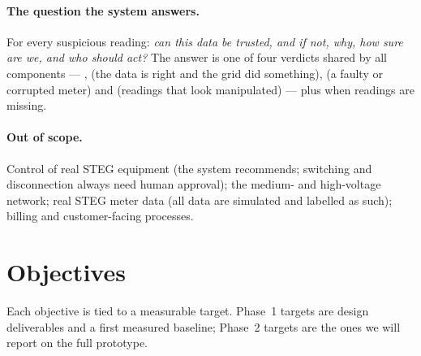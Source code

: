 \paragraph{The question the system answers.} For every suspicious reading: \emph{can this data be trusted,
and if not, why, how sure are we, and who should act?} The answer is one of four verdicts shared by all
components --- \NORM, \GE{} (the data is right and the grid did something), \MF{} (a faulty or corrupted
meter) and \SD{} (readings that look manipulated) --- plus \ND{} when readings are missing.

\paragraph{Out of scope.} Control of real STEG equipment (the system recommends; switching and disconnection
always need human approval); the medium- and high-voltage network; real STEG meter data (all data are
simulated and labelled as such); billing and customer-facing processes.

\section{Objectives}
\label{sec:objectives}

Each objective is tied to a measurable target. Phase~1 targets are design deliverables and a first measured
baseline; Phase~2 targets are the ones we will report on the full prototype.

